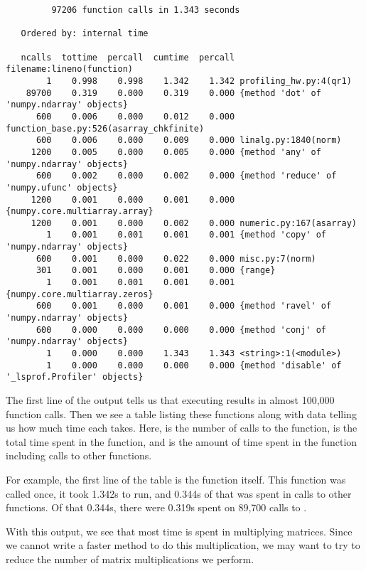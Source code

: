 {\scriptsize
\begin{verbatim}
         97206 function calls in 1.343 seconds

   Ordered by: internal time

   ncalls  tottime  percall  cumtime  percall filename:lineno(function)
        1    0.998    0.998    1.342    1.342 profiling_hw.py:4(qr1)
    89700    0.319    0.000    0.319    0.000 {method 'dot' of 'numpy.ndarray' objects}
      600    0.006    0.000    0.012    0.000 function_base.py:526(asarray_chkfinite)
      600    0.006    0.000    0.009    0.000 linalg.py:1840(norm)
     1200    0.005    0.000    0.005    0.000 {method 'any' of 'numpy.ndarray' objects}
      600    0.002    0.000    0.002    0.000 {method 'reduce' of 'numpy.ufunc' objects}
     1200    0.001    0.000    0.001    0.000 {numpy.core.multiarray.array}
     1200    0.001    0.000    0.002    0.000 numeric.py:167(asarray)
        1    0.001    0.001    0.001    0.001 {method 'copy' of 'numpy.ndarray' objects}
      600    0.001    0.000    0.022    0.000 misc.py:7(norm)
      301    0.001    0.000    0.001    0.000 {range}
        1    0.001    0.001    0.001    0.001 {numpy.core.multiarray.zeros}
      600    0.001    0.000    0.001    0.000 {method 'ravel' of 'numpy.ndarray' objects}
      600    0.000    0.000    0.000    0.000 {method 'conj' of 'numpy.ndarray' objects}
        1    0.000    0.000    1.343    1.343 <string>:1(<module>)
        1    0.000    0.000    0.000    0.000 {method 'disable' of '_lsprof.Profiler' objects}
\end{verbatim}
}


The first line of the output tells us that executing  results in almost 100,000 function calls.
Then we see a table listing these functions along with data telling us how much time each takes.
Here,  is the number of calls to the function,  is the total time spent in the function, and  is the amount of time spent in the function including calls to other functions.

For example, the first line of the table is the function  itself.
This function was called once, it took 1.342s to run, and 0.344s of that was spent in calls to other functions.
Of that 0.344s, there were 0.319s spent on 89,700 calls to .

With this output, we see that most time is spent in multiplying matrices.
Since we cannot write a faster method to do this multiplication, we may want to try to reduce the number of matrix multiplications we perform.

